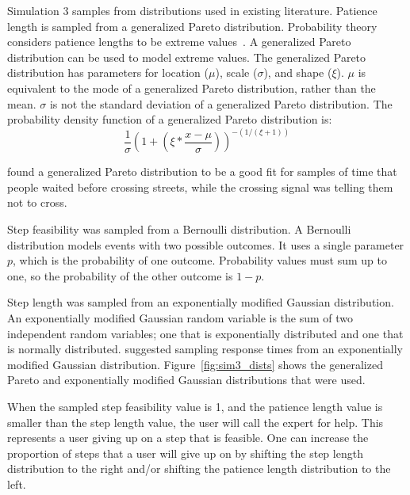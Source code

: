 Simulation 3 samples from distributions used in existing literature.
Patience length is sampled from a generalized Pareto distribution.
Probability theory considers patience lengths to be extreme
values~\cite{patience}.
A generalized Pareto distribution can be used to model extreme values.
The generalized Pareto distribution has parameters for location ($\mu$), scale
($\sigma$), and shape ($\xi$).
$\mu$ is equivalent to the mode of a generalized Pareto distribution, rather than
the mean.
$\sigma$ is not the standard deviation of a generalized Pareto distribution.
The probability density function of a generalized Pareto distribution is:
\[
  \frac{1}{\sigma} \left(1 + \left(\xi * \frac{x - \mu}{\sigma}\right)
  \right)^{-(1/(\xi + 1))}
\]


\citet{patience} found a generalized Pareto distribution to be a good fit for
samples of time that people waited before crossing streets, while the crossing
signal was telling them not to cross.

Step feasibility was sampled from a Bernoulli distribution.
A Bernoulli distribution models events with two possible outcomes.
It uses a single parameter $p$, which is the probability of one outcome.
Probability values must sum up to one, so the probability of the other outcome
is $1-p$.

Step length was sampled from an exponentially modified Gaussian distribution.
An exponentially modified Gaussian random variable is the sum of two independent
random variables; one that is exponentially distributed and one that is normally
distributed.
\citet{dawson1988fitting} suggested sampling response times from an
exponentially modified Gaussian distribution.
Figure~\ref{fig:sim3_dists} shows the generalized Pareto and exponentially
modified Gaussian distributions that were used.

When the sampled step feasibility value is 1, and the patience length value is
smaller than the step length value, the user will call the expert for help.
This represents a user giving up on a step that is feasible.
One can increase the proportion of steps that a user will give up on by shifting
the step length distribution to the right and/or shifting the patience length
distribution to the left.

